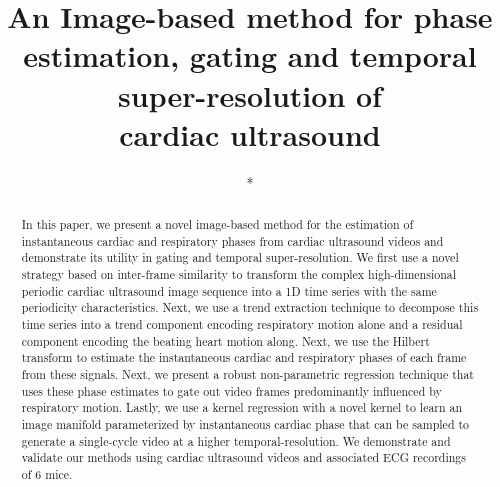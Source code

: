 \documentclass[runningheads,a4paper]{llncs}
\begin{document}
\mainmatter  %

\title{An Image-based method for phase estimation, gating and temporal super-resolution of \\cardiac ultrasound}


%
%

\author{*}
\authorrunning{*}   
\tocauthor{*}
\institute{*}

\maketitle

\begin{abstract}
In this paper, we present a novel image-based method for the estimation of instantaneous cardiac and respiratory phases from cardiac ultrasound videos and demonstrate its utility in gating and temporal super-resolution. We first use a novel strategy based on inter-frame similarity to transform the complex high-dimensional periodic cardiac ultrasound image sequence into a 1D time series with the same periodicity characteristics.  Next, we use a trend extraction technique to decompose this time series into a  trend component encoding respiratory motion alone and a residual component encoding the beating heart motion along. Next, we use the Hilbert transform to estimate the instantaneous cardiac and respiratory phases of each frame from these signals. Next, we present a robust non-parametric regression technique that uses these phase estimates to gate out video frames predominantly influenced by respiratory motion. Lastly, we use a kernel regression with a novel kernel to learn an image manifold parameterized by instantaneous cardiac phase that can be sampled to generate a single-cycle video at a higher temporal-resolution. We demonstrate and validate our methods using cardiac ultrasound videos and associated ECG recordings of 6 mice.
\end{abstract}

\end{document}
